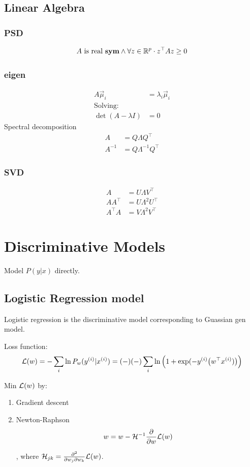 \documentclass[a4paper]{report}
\begin{document}
\section{Linear Algebra}
\subsection{PSD}
$$
A \text{ is real \textbf{sym}} \wedge\forall z\in \mathbb{R}^p\cdot z^\top Az \geq 0
$$
\subsection{eigen}
\begin{align*}
A \vec\mu_i &=\lambda_i \vec\mu_i\\
\text{Solving:} \\
\det(A-\lambda I) &= 0
\end{align*}
Spectral decomposition 
\begin{align*}
A &= Q\Lambda Q^\top \\
A^{-1} &=Q\Lambda^{-1}Q^\top
\end{align*}

\subsection{SVD}
\begin{align*}
A &= U\Lambda V^\top\\
AA^\top &= U\Lambda^2U^\top \\
A^\top A &= V\Lambda^2V^\top
\end{align*}

\chapter{Discriminative Models}
Model $P(y|x)$ directly.
\section{Logistic Regression model}
Logistic regression is the discriminative model corresponding to Guassian gen model.

Loss function:
$$
\mathcal{L}(w) = -\sum_{i} \ln {P_w(y^{(i)}|x^{(i)})} = (-)(-) \sum_{i} \ln {\Big(1+\exp(-y^{(i)}\big(w^\top x^{(i)})\big)\Big)}
$$

Min $\mathcal{L}(w)$ by:
\begin{enumerate}
\item Gradient descent
\item Newton-Raphson
$$
w = w -\mathcal{H}^{-1} \frac{\partial}{\partial w} \mathcal{L}(w)
$$

, where $\mathcal{H}_{jk} = \frac{\partial^2}{\partial w_j \partial w_k} \mathcal{L}(w)$.
\end{enumerate}
\end{document}

